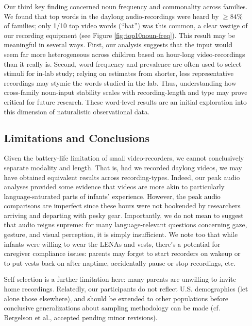 \documentclass[man]{apa6}
\theoremstyle{definition}
\theoremstyle{definition}
\theoremstyle{definition}
\theoremstyle{remark}
\begin{document}
Our third key finding concerned noun frequency and commonality across
families. We found that top words in the daylong audio-recordings were
heard by \(\geq84\%\) of families; only 1/10 top video words
(\enquote{hat}) was this common, a clear vestige of our recording
equipment (see Figure \ref{fig:top10noun-freq}). This result may be
meaningful in several ways. First, our analysis suggests that the input
would seem far more heterogeneous across children based on hour-long
video-recordings than it really is. Second, word frequency and
prevalence are often used to select stimuli for in-lab study; relying on
estimates from shorter, less representative recordings may stymie the
words studied in the lab. Thus, understanding how cross-family
noun-input stability scales with recording-length and type may prove
critical for future research. These word-level results are an initial
exploration into this dimension of naturalistic observational data.

\subsection{Limitations and
Conclusions}\label{limitations-and-conclusions}

Given the battery-life limitation of small video-recorders, we cannot
conclusively separate modality and length. That is, had we recorded
daylong videos, we may have obtained equivalent results across
recording-types. Indeed, our peak audio analyses provided some evidence
that videos are more akin to particularly language-saturated parts of
infants' experience. However, the peak audio comparisons are imperfect
since these hours were not bookended by researchers arriving and
departing with pesky gear. Importantly, we do not mean to suggest that
audio reigns supreme: for many language-relevant questions concerning
gaze, gesture, and visual perception, it is simply insufficient. We note
too that while infants were willing to wear the LENAs and vests, there's
a potential for caregiver compliance issues: parents may forget to start
recorders on wakeup or to put vests back on after naptime, accidentally
pause or stop recordings, etc.

Self-selection is a further limitation here: many parents are unwilling
to invite home recordings. Relatedly, our participants do not reflect
U.S. demographics (let alone those elsewhere), and should be extended to
other populations before conclusive generalizations about sampling
methodology can be made (cf. Bergelson et al., accepted pending minor
revisions).
\end{document}
